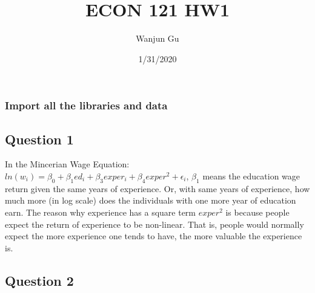 \documentclass[
]{article}
\title{ECON 121 HW1}
\author{Wanjun Gu}
\date{1/31/2020}
\newenvironment{Shaded}{\begin{snugshade}}{\end{snugshade}}
\newcommand{\DataTypeTok}[1]{\textcolor[rgb]{0.13,0.29,0.53}{#1}}
\newcommand{\KeywordTok}[1]{\textcolor[rgb]{0.13,0.29,0.53}{\textbf{#1}}}
\newcommand{\NormalTok}[1]{#1}
\newcommand{\OperatorTok}[1]{\textcolor[rgb]{0.81,0.36,0.00}{\textbf{#1}}}
\newcommand{\OtherTok}[1]{\textcolor[rgb]{0.56,0.35,0.01}{#1}}
\newcommand{\StringTok}[1]{\textcolor[rgb]{0.31,0.60,0.02}{#1}}
\begin{document}
\maketitle

\hypertarget{import-all-the-libraries-and-data}{%
\subsubsection{Import all the libraries and
data}\label{import-all-the-libraries-and-data}}

\begin{Shaded}
\end{Shaded}

\hypertarget{question-1}{%
\subsection{Question 1}\label{question-1}}

In the Mincerian Wage Equation:
\(ln(w_{i}) = \beta_{0} + \beta_{1}ed_{i} + \beta_{3}exper_{i} + \beta_{4}exper^{2} + \epsilon_{i}\),
\(\beta_1\) means the education wage return given the same years of
experience. Or, with same years of experience, how much more (in log
scale) does the individuals with one more year of education earn. The
reason why experience has a square term \(exper^2\) is because people
expect the return of experience to be non-linear. That is, people would
normally expect the more experience one tends to have, the more valuable
the experience is.

\hypertarget{question-2}{%
\subsection{Question 2}\label{question-2}}
\end{document}
